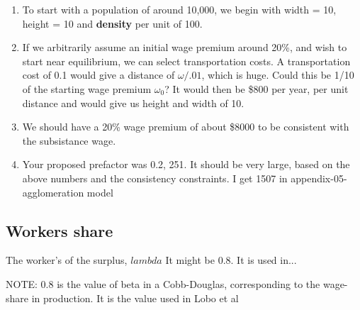 \begin{enumerate}
\item To start with a population of around 10,000, we begin with width = 10, height = 10 and \textbf{density} per unit of 100. 

\item If we arbitrarily assume an initial wage premium around 20\%, and wish to start near equilibrium, %
we can select transportation costs. A transportation cost of 0.1  would give a distance of $\omega/.01$, which is huge. Could this be 1/10 of the starting wage premium $\omega_0$? It would then be \$800 per year, per unit distance and would give us height and width of 10. 
\item We should have a 20\% wage premium of about \$8000 to be consistent with the subsistance wage. %

\item Your proposed prefactor was 0.2,  251. It should be very large, based on the above numbers and the consistency constraints. I get 1507 in appendix-05-agglomeration model



\end{enumerate}

\subsection{Workers share}
The worker's of the surplus, $lambda$ It might be 0.8. It is used in...

NOTE: 0.8 is the value of beta in a Cobb-Douglas, corresponding to the wage-share in production. It is the value used in Lobo et al



